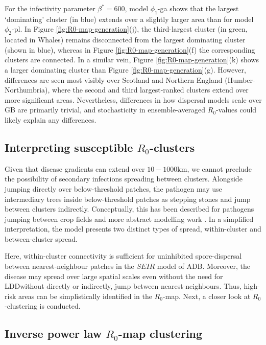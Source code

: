 For the infectivity parameter $\beta^*=600$, model $\phi_1$-ga shows that the largest `dominating' cluster (in blue) extends over a slightly larger area than for model $\phi_2$-pl.
In Figure \ref{fig:R0-map-generation}(j), the third-largest cluster (in green, located in Whales) remains disconnected from the largest dominating cluster (shown in blue),
whereas in Figure \ref{fig:R0-map-generation}(f) the corresponding clusters are connected. 
In a similar vein, Figure \ref{fig:R0-map-generation}(k) shows a larger dominating cluster than Figure \ref{fig:R0-map-generation}(g).
However, differences are seen most visibly over Scotland and Northern England (Humber-Northumbria), where the second and third largest-ranked clusters extend over more significant areas.
Nevertheless, differences in how dispersal models scale over GB are primarily trivial, and stochasticity in ensemble-averaged $R_0$-values could likely explain any differences.

\subsection{Interpreting susceptible $R_0$-clusters}

Given that disease gradients can extend over $10-1000\mathrm{km}$, we cannot preclude the possibility of secondary infections spreading between clusters.
Alongside jumping directly over below-threshold patches, the pathogen may use intermediary trees inside below-threshold patches as stepping stones and jump between clusters indirectly. 
Conceptually, this has been described for pathogens jumping between crop fields \cite{Gilligan-disease-management} and more abstract modelling work \cite{wingen2013long}.
In a simplified interpretation, the model presents two distinct types of spread, within-cluster and between-cluster spread. 

Here, within-cluster connectivity is sufficient for uninhibited spore-dispersal between nearest-neighbour patches in the $SEIR$ model of ADB.
Moreover, the disease may spread over large spatial scales even without the need for LDD\textemdash without directly or indirectly, jump between nearest-neighbours.
Thus, high-risk areas can be simplistically identified in the $R_0$-map.
Next, a closer look at $R_0$-clustering is conducted.

\subsection{Inverse power law $R_0$-map clustering}
\label{sec:inverse-power-law-r0-clustering}

